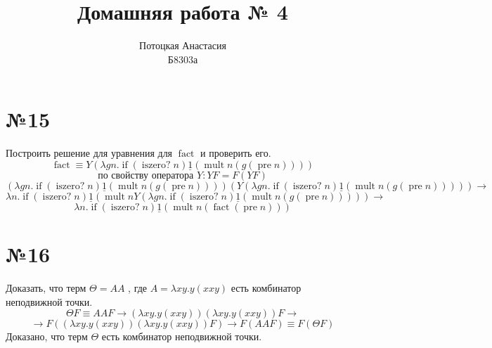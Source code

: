 \documentclass[a4paper,14pt]{scrreprt}
\title{Домашняя работа № 4}
\author{Потоцкая Анастасия\\Б8303а}
\newcommand{\lmd}{\lambda}
\newcommand{\un}[1]{\underline{#1}}
\DeclareMathOperator{\fact}{fact}
\DeclareMathOperator{\mif}{if}
\DeclareMathOperator{\miszero}{iszero?}
\DeclareMathOperator{\mmult}{mult}
\DeclareMathOperator{\mpre}{pre}
\begin{document}
\maketitle
\section*{№15}
Построить решение для уравнения для $ \fact$ и проверить его.
	$$ \fact \equiv Y ( \lmd gn. \mif (\miszero n)\un{1} (\mmult n (g(\mpre n)))) $$
	$$ \text{по свойству оператора  } Y : YF = F(YF) $$
	$$ ( \lmd gn. \mif (\miszero n)\un{1} (\mmult n (g(\mpre n)))) (Y ( \lmd gn. \mif (\miszero n)\un{1} (\mmult n (g(\mpre n))))) \to $$
	$$ \lmd n. \mif (\miszero n)\un{1} (\mmult n Y ( \lmd gn. \mif (\miszero n)\un{1} (\mmult n (g(\mpre n)))) ) \to $$
	$$ \lmd n. \mif (\miszero n)\un{1} (\mmult n (\fact(\mpre n)) )$$

\section*{№16}
Доказать, что терм $ \Theta = A A $ , где $ A=\lmd xy. y(xxy)$ есть комбинатор неподвижной точки.
$$ \Theta F \equiv AAF \to (\lmd xy.y(xxy))(\lmd xy.y(xxy))F \to $$
$$ \to F((\lmd xy.y(xxy))(\lmd xy.y(xxy))F ) \to F(AAF) \equiv F(\Theta F) $$
Доказано, что терм $ \Theta $ есть комбинатор неподвижной точки.
\end{document}
